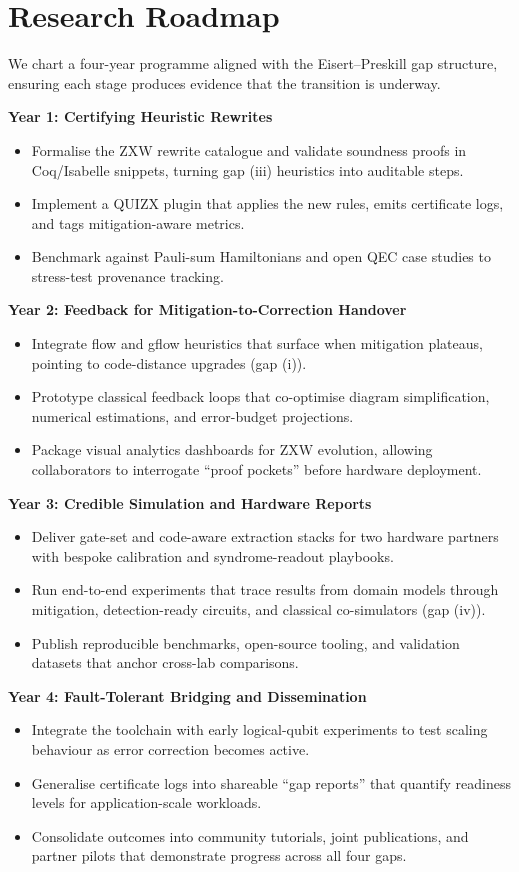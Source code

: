 \section{Research Roadmap}
We chart a four-year programme aligned with the Eisert--Preskill gap structure, ensuring each stage produces evidence that the transition is underway.

\textbf{Year 1: Certifying Heuristic Rewrites}
\begin{itemize}
  \item Formalise the ZXW rewrite catalogue and validate soundness proofs in Coq/Isabelle snippets, turning gap (iii) heuristics into auditable steps.
  \item Implement a QUIZX plugin that applies the new rules, emits certificate logs, and tags mitigation-aware metrics.
  \item Benchmark against Pauli-sum Hamiltonians and open QEC case studies to stress-test provenance tracking.
\end{itemize}

\textbf{Year 2: Feedback for Mitigation-to-Correction Handover}
\begin{itemize}
  \item Integrate flow and gflow heuristics that surface when mitigation plateaus, pointing to code-distance upgrades (gap (i)).
  \item Prototype classical feedback loops that co-optimise diagram simplification, numerical estimations, and error-budget projections.
  \item Package visual analytics dashboards for ZXW evolution, allowing collaborators to interrogate ``proof pockets'' before hardware deployment.
\end{itemize}

\textbf{Year 3: Credible Simulation and Hardware Reports}
\begin{itemize}
  \item Deliver gate-set and code-aware extraction stacks for two hardware partners with bespoke calibration and syndrome-readout playbooks.
  \item Run end-to-end experiments that trace results from domain models through mitigation, detection-ready circuits, and classical co-simulators (gap (iv)).
  \item Publish reproducible benchmarks, open-source tooling, and validation datasets that anchor cross-lab comparisons.
\end{itemize}

\textbf{Year 4: Fault-Tolerant Bridging and Dissemination}
\begin{itemize}
  \item Integrate the toolchain with early logical-qubit experiments to test scaling behaviour as error correction becomes active.
  \item Generalise certificate logs into shareable ``gap reports'' that quantify readiness levels for application-scale workloads.
  \item Consolidate outcomes into community tutorials, joint publications, and partner pilots that demonstrate progress across all four gaps.
\end{itemize}
